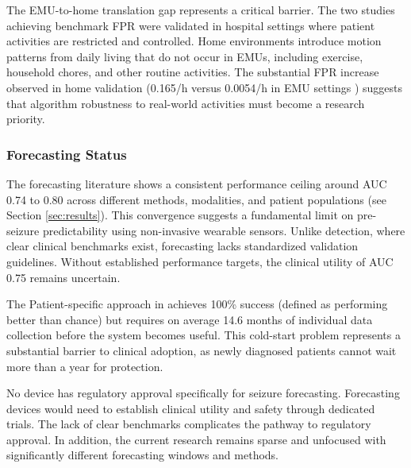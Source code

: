 The EMU-to-home translation gap represents a critical barrier. The two studies achieving benchmark FPR were validated in hospital settings where patient activities are restricted and controlled. Home environments introduce motion patterns from daily living that do not occur in EMUs, including exercise, household chores, and other routine activities. The substantial FPR increase observed in home validation (0.165/h versus 0.0054/h in EMU settings \parencite{dongDetectionNocturnalEpileptic2026,spahrDeepLearningbasedDetection2025}) suggests that algorithm robustness to real-world activities must become a research priority.

\subsubsection{Forecasting Status}

The forecasting literature shows a consistent performance ceiling around AUC 0.74 to 0.80 across different methods, modalities, and patient populations (see Section \ref{sec:results}). This convergence suggests a fundamental limit on pre-seizure predictability using non-invasive wearable sensors. Unlike detection, where clear clinical benchmarks exist, forecasting lacks standardized validation guidelines. Without established performance targets, the clinical utility of AUC 0.75 remains uncertain.

The Patient-specific approach in \textcite{stirlingForecastingSeizureLikelihood2021} achieves 100\% success (defined as performing better than chance) but requires on average 14.6 months of individual data collection before the system becomes useful. This cold-start problem represents a substantial barrier to clinical adoption, as newly diagnosed patients cannot wait more than a year for protection.

No device has regulatory approval specifically for seizure forecasting. Forecasting devices would need to establish clinical utility and safety through dedicated trials. The lack of clear benchmarks complicates the pathway to regulatory approval. In addition, the current research remains sparse and unfocused with significantly different forecasting windows and methods.
